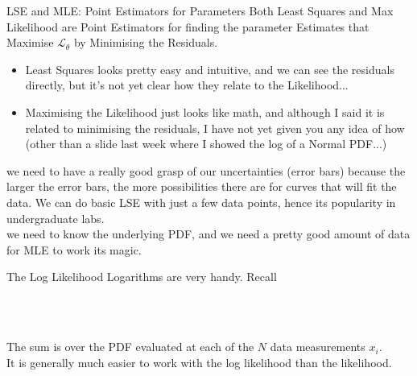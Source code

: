 \documentclass[10pt,sans,english,compress,xcolor=dvipsnames]{beamer}
\begin{document}
\begin{frame}{LSE and MLE: Point Estimators for Parameters}
\footnotesize
Both Least Squares and Max Likelihood are Point Estimators for finding the parameter Estimates that Maximise  $\mathcal{L}_{\theta}$ by Minimising the Residuals.\\
\begin{itemize}
\item Least Squares looks pretty easy and intuitive, and we can see the residuals directly, but it's not yet clear how they relate to the Likelihood...
\item Maximising the Likelihood just looks like math, and although I said it is related to minimising the residuals, I have not yet given you any idea of how (other than a slide last week where I showed the log of a Normal PDF...)
\end{itemize}

 we need to have a really good grasp of our uncertainties (error bars) because the larger the error bars, the more possibilities there are for curves that will fit the data. We can do basic LSE with just a few data points, hence its popularity in undergraduate labs.\\[1ex]

 we need to know the underlying PDF, and we need a pretty good amount of data for MLE to work its magic.\\[1ex]

\end{frame}


\begin{frame}{The Log Likelihood}
\footnotesize
Logarithms are very handy. Recall \\[1ex]


\\

\begin{center}
\\[2ex]
\end{center}

The sum is over the PDF evaluated at each of the $N$ data measurements $x_i$.\\[1ex]

It is generally much easier to work with the log likelihood than the likelihood.\\[1ex]

\end{frame}
\end{document}

